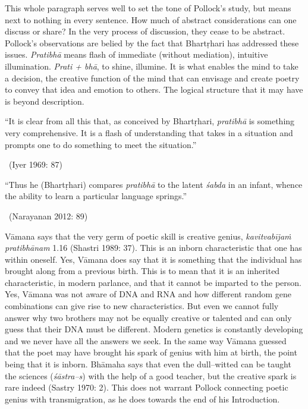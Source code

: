 This whole paragraph serves well to set the tone of Pollock’s study, but means next to nothing in every sentence. How much of abstract considerations can one discuss or share? In the very process of discussion, they cease to be abstract. Pollock’s observations are belied by the fact that Bhartṛhari has addressed these issues. \textit{Pratibhā} means flash of immediate (without mediation), intuitive illumination. \textit{Prati + bhā}, to shine, illumine. It is what enables the mind to take a decision, the creative function of the mind that can envisage and create poetry to convey that idea and emotion to others. The logical structure that it may have is beyond description.

\begin{myquote}
“It is clear from all this that, as conceived by Bhartṛhari, \textit{pratibhā }is something very comprehensive. It is a flash of understanding that takes in a situation and prompts one to do something to meet the situation.” 

~\hfill (Iyer 1969: 87)
\end{myquote}

\begin{myquote}
“Thus he (Bhartṛhari) compares \textit{pratibhā} to the latent \textit{śabda} in an infant, whence the ability to learn a particular language springs.” 

~\hfill (Narayanan 2012: 89)
\end{myquote}

Vāmana says that the very germ of poetic skill is creative genius, \textit{kavitvabījaṁ pratibhānam }1.16 (Shastri 1989: 37). This is an inborn characteristic that one has within oneself. Yes, Vāmana does say that it is something that the individual has brought along from a previous birth. This is to mean that it is an inherited characteristic, in modern parlance, and that it cannot be imparted to the person. Yes, Vāmana was not aware of DNA and RNA and how different random gene combinations can give rise to new characteristics. But even we cannot fully answer why two brothers may not be equally creative or talented and can only guess that their DNA must be different. Modern genetics is constantly developing and we never have all the answers we seek. In the same way Vāmana guessed that the poet may have brought his spark of genius with him at birth, the point being that it is inborn. Bhāmaha says that even the dull–witted can be taught the sciences (\textit{śāstra–s}) with the help of a good teacher, but the creative spark is rare indeed (Sastry 1970: 2). This does not warrant Pollock connecting poetic genius with transmigration, as he does towards the end of his Introduction.

